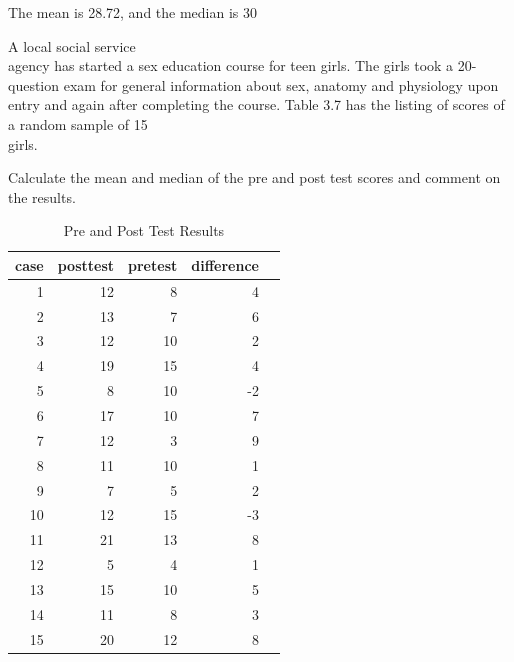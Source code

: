 \documentclass[11pt, chapterprefix=true]{scrbook}\usepackage[]{graphicx}\usepackage[]{color}
\begin{document}
\begin{exercises}
\begin{solution}
  The mean is 28.72, and the median is 30

	\end{solution}

	\begin{exercise} %

A local social service \\ agency has started a sex education course for teen girls.  The girls took a 20-question exam for general information about sex, anatomy and physiology upon entry and again after completing the course.  Table 3.7 has the listing of scores of a random sample of 15 \\ girls.

Calculate the mean and median of the pre and post test scores and comment on the results.

\begin{table}[ht]
 \centering
 \caption{Pre and Post Test Results}

 {\small{
 \begin{tabular}{@{} rrrrr @{}}
   \hline
   case & posttest & pretest & difference \\
   \hline
    1 &  12 &   8 &   4 \\
      2 &  13 &   7 &   6 \\
      3 &  12 &  10 &   2 \\
      4 &  19 &  15 &   4 \\
      5 &   8 &  10 &  -2 \\
      6 &  17 &  10 &   7 \\
      7 &  12 &   3 &   9 \\
      8 &  11 &  10 &   1 \\
      9 &   7 &   5 &   2 \\
     10 &  12 &  15 &  -3 \\
     11 &  21 &  13 &   8 \\
     12 &   5 &   4 &   1 \\
     13 &  15 &  10 &   5 \\
     14 &  11 &   8 &   3 \\
     15 &  20 &  12 &   8 \\
    \hline
 \end{tabular}
 }}

 \label{tab:t3_14}
\end{table}

	\vspace{2mm}
	\end{exercise}
	\vspace{2mm}
	\begin{solution}  %





\end{solution}
\end{exercises}
\end{document}
